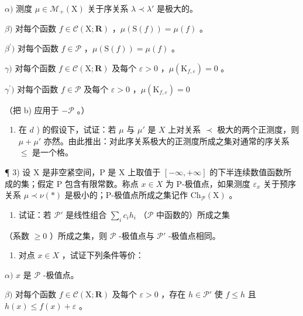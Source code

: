 \(\alpha)\) 测度 \(\mu \in \mathcal{M}_{+}(\mathrm{X})\) 关于序关系 \(\lambda \prec \lambda'\) 是极大的。

\(\beta)\) 对每个函数 \(f \in \mathcal{C}(\mathrm{X}; \mathbf{R})\) ，\(\mu(\mathrm{S}(f)) = \mu(f)\) 。

\(\beta^{\prime})\) 对每个函数 \(f \in \mathcal{P}\) ，\(\mu(\mathrm{S}(f)) = \mu(f)\) 。

\(\gamma)\) 对每个函数 \(f \in \mathcal{C}(\mathrm{X}; \mathbf{R})\) 及每个 \(\varepsilon > 0\) ，\(\mu(\mathrm{K}_{f,\varepsilon}) = 0\) 。

\(\gamma^{\prime})\) 对每个函数 \(f\in \mathcal{P}\) 及每个 \(\varepsilon >0\) ，\(\mu (\mathrm{K}_{f,\varepsilon}) = 0\)

（把 b) 应用于 \(-\mathcal{P}\) 。）

\begin{enumerate}
\def\labelenumi{\alph{enumi})}
\setcounter{enumi}{4}
\tightlist
\item
  在 \(d\) ) 的假设下，试证：若 \(\mu\) 与 \(\mu'\) 是 \(X\) 上对关系 \(\prec\) 极大的两个正测度，则 \(\mu + \mu'\) 亦然。由此推出：对此序关系极大的正测度所成之集对通常的序关系 \(\leqslant\) 是一个格。
\end{enumerate}

¶ 3) 设 X 是非空紧空间，P 是 X 上取值于 \([-\infty, +\infty]\) 的下半连续数值函数所成的集；假定 P 包含有限常数。称点 \(x \in X\) 为 P-极值点，如果测度 \(\varepsilon_{x}\) 关于预序关系 \(\mu \prec \nu (*)\) 是极小的；P-极值点所成之集记作 \(\mathrm{Ch}_{\mathcal{P}}(\mathrm{X})\) 。

\begin{enumerate}
\def\labelenumi{\alph{enumi})}
\tightlist
\item
  试证：若 \(\mathcal{P}'\) 是线性组合 \(\sum_{i} c_i h_i\) （\(\mathcal{P}\) 中函数的）所成之集
\end{enumerate}

（系数 \(\geqslant 0\) ）所成之集，则 \(\mathcal{P}\) -极值点与 \(\mathcal{P}'\) -极值点相同。

\begin{enumerate}
\def\labelenumi{\alph{enumi})}
\setcounter{enumi}{1}
\tightlist
\item
  对点 \(x \in X\) ，试证下列条件等价：
\end{enumerate}

\(\alpha)\) \(x\) 是 \(\mathcal{P}\) -极值点。

\(\beta)\) 对每个函数 \(f \in \mathcal{C}(\mathrm{X}; \mathbf{R})\) 及每个 \(\varepsilon > 0\) ，存在 \(h \in \mathcal{P}'\) 使 \(f \leqslant h\) 且 \(h(x) \leqslant f(x) + \varepsilon\) 。

